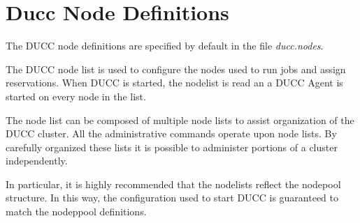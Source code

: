 % 
% 
% 
% 
\section{Ducc Node Definitions}
\label{sec:admin-ducc.nodes}
    The DUCC node definitions are specified by default in the file {\em ducc.nodes}.

    The DUCC node list is used to configure the nodes used to run jobs and assign reservations. 
    When DUCC is started, the nodelist is read an a DUCC Agent is started on every node in the list.

    The node list can be composed of multiple node lists to assist organization of the DUCC cluster. 
    All the administrative commands operate upon node lists. By carefully organized these lists it is 
    possible to administer portions of a cluster independently. 

    In particular, it is highly recommended that the nodelists reflect the nodepool structure.  In
    this way, the configuration used to start DUCC is guaranteed to match the nodeppool definitions.

